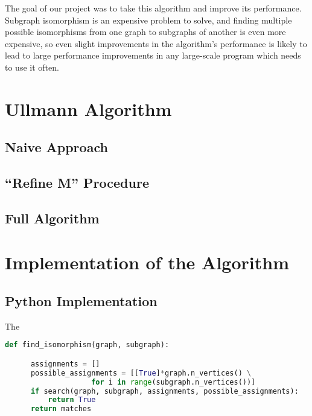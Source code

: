 \documentclass{article}
\begin{document}
The goal of our project was to take this algorithm and improve its performance. Subgraph isomorphism is an expensive problem to solve, and finding multiple possible isomorphisms from one graph to subgraphs of another is even more expensive, so even slight improvements in the algorithm's performance is likely to lead to large performance improvements in any large-scale program which needs to use it often.

\section{Ullmann Algorithm}

  \subsection{Naive Approach}

  \subsection{``Refine M'' Procedure}

  \subsection{Full Algorithm}

\section{Implementation of the Algorithm}

  \subsection{Python Implementation}
  The 

  \begin{lstlisting}[language=Python,caption={Function used to determine whether an isomorphism exists.}]
  def find_isomorphism(graph, subgraph):

      assignments = []
      possible_assignments = [[True]*graph.n_vertices() \
                    for i in range(subgraph.n_vertices())]
      if search(graph, subgraph, assignments, possible_assignments):
          return True
      return matches
  \end{lstlisting}
\end{document}
